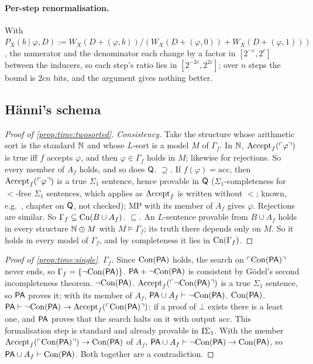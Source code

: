 \paragraph{Per-step renormalisation.} With $P_X(b\mid\varphi,D):=W_X(D+(\varphi,b))/(W_X(D+(\varphi,0))+W_X(D+(\varphi,1)))$, the numerator and the denominator each change by a factor in $[2^{-c},2^c]$ between the inducers, so each step's ratio lies in $[2^{-2c},2^{2c}]$; over $n$ steps the bound is $2cn$ bits, and the argument gives nothing better.

\subsection{H\"anni's schema}\label{app:time:schema}

\begin{proof}[Proof of \cref{prop:time:twosorted}]
\emph{Consistency.} Take the structure whose arithmetic sort is the standard $\mathbb{N}$ and whose $L$-sort is a model $M$ of $\Gamma_f$. In $\mathbb{N}$, $\mathrm{Accept}_{f}(\ulcorner \varphi\urcorner)$ is true iff $f$ accepts $\varphi$, and then $\varphi\in\Gamma_f$ holds in $M$; likewise for rejections. So every member of $A_f$ holds, and so does $\mathsf{Q}$.
\emph{$\supseteq$.} If $f(\varphi)=\mathrm{acc}$, then $\mathrm{Accept}_{f}(\ulcorner \varphi\urcorner)$ is a true $\Sigma_1$ sentence, hence provable in $\mathsf{Q}$ ($\Sigma_1$-completeness for $<$-free $\Sigma_1$ sentences, which applies as $\mathrm{Accept}_{f}$ is written without $<$; known, e.g.\ \citealp{boolos2007computability}, chapter on $\mathsf{Q}$, not checked); MP with its member of $A_f$ gives $\varphi$. Rejections are similar. So $\Gamma_f\subseteq\mathrm{Cn}(B\cup A_f)$.
\emph{$\subseteq$.} An $L$-sentence provable from $B\cup A_f$ holds in every structure $\mathbb{N}\oplus M$ with $M\models\Gamma_f$; its truth there depends only on $M$. So it holds in every model of $\Gamma_f$, and by completeness it lies in $\mathrm{Cn}(\Gamma_f)$.
\end{proof}

\begin{proof}[Proof of \cref{prop:time:single}]
\emph{$\Gamma_f$.} Since $\mathrm{Con}(\mathsf{PA})$ holds, the search on $\ulcorner \mathrm{Con}(\mathsf{PA})\urcorner$ never ends, so $\Gamma_f=\{\neg\mathrm{Con}(\mathsf{PA})\}$. $\mathsf{PA}+\neg\mathrm{Con}(\mathsf{PA})$ is consistent by Gödel's second incompleteness theorem.
\emph{$\neg\mathrm{Con}(\mathsf{PA})$.} $\mathrm{Accept}_{f}(\ulcorner \neg\mathrm{Con}(\mathsf{PA})\urcorner)$ is a true $\Sigma_1$ sentence, so $\mathsf{PA}$ proves it; with its member of $A_f$, $\mathsf{PA}\cup A_f\vdash\neg\mathrm{Con}(\mathsf{PA})$.
\emph{$\mathrm{Con}(\mathsf{PA})$.} $\mathsf{PA}\vdash\neg\mathrm{Con}(\mathsf{PA})\to\mathrm{Accept}_{f}(\ulcorner \mathrm{Con}(\mathsf{PA})\urcorner)$: if a proof of $\bot$ exists there is a least one, and $\mathsf{PA}$ proves that the search halts on it with output $\mathrm{acc}$. This formalisation step is standard and already provable in $\mathrm{I}\Sigma_{1}$. With the member $\mathrm{Accept}_{f}(\ulcorner \mathrm{Con}(\mathsf{PA})\urcorner)\to\mathrm{Con}(\mathsf{PA})$ of $A_f$, $\mathsf{PA}\cup A_f\vdash\neg\mathrm{Con}(\mathsf{PA})\to\mathrm{Con}(\mathsf{PA})$, so $\mathsf{PA}\cup A_f\vdash\mathrm{Con}(\mathsf{PA})$. Both together are a contradiction.
\end{proof}

